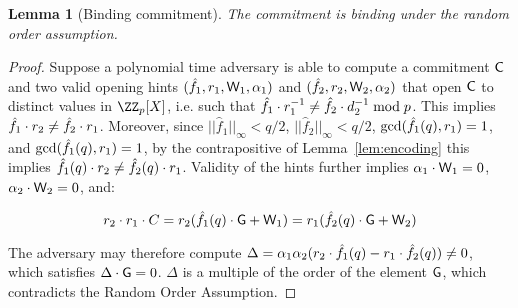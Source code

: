 \documentclass[12pt]{article}
\theoremstyle{Definition}
\newtheorem{lemma}{Lemma}
\begin{document}
\begin{lemma}[Binding commitment]
\label{lem:aug-com-binding}
	The commitment is binding under the random order assumption. 
\end{lemma}
\begin{proof}
	Suppose a polynomial time adversary is able to compute a commitment $\mathsf{C}$ and two valid opening hints $(\hat{f}_1, r_1, \mathsf{W}_1, \alpha_1)$ and $(\hat{f}_2, r_2, \mathsf{W}_2, \alpha_2)$ that open $\mathsf{C}$ to distinct values in $\ZZ_p[X]$, i.e. such that $\hat{f}_1 \cdot r_1^{-1} \neq \hat{f}_2 \cdot d_2^{-1} \bmod p$. 
	This implies $\hat{f}_1 \cdot r_2 \neq \hat{f}_2 \cdot r_1$. Moreover, since $||\hat{f}_1||_\infty < q/2$, $||\hat{f}_2||_\infty < q/2$, $\gcd(\hat{f}_1(q), r_1) = 1$, and $\gcd(\hat{f}_1(q), r_1) = 1$, by the contrapositive of Lemma~\ref{lem:encoding} this implies $\hat{f}_1(q) \cdot r_2 \neq \hat{f}_2(q) \cdot r_1$. Validity of the hints further implies $\alpha_1 \cdot \mathsf{W}_1 = 0$, $\alpha_2 \cdot \mathsf{W}_2 = 0$, and: 
	
	$$r_2 \cdot r_1 \cdot C = r_2 (\hat{f}_1(q) \cdot \mathsf{G} + \mathsf{W}_1) = r_1(\hat{f}_2(q) \cdot \mathsf{G} + \mathsf{W}_2)$$ 
	
	The adversary may therefore compute $\Delta = \alpha_1 \alpha_2 (r_2 \cdot \hat{f}_1(q)  - r_1 \cdot \hat{f}_2(q)) \neq 0$, which satisfies $\Delta \cdot \mathsf{G} = 0$. $\Delta$ is a multiple of the order of the element $\mathsf{G}$, which contradicts the Random Order Assumption. 
	 
	\end{proof}
	
\end{document}
